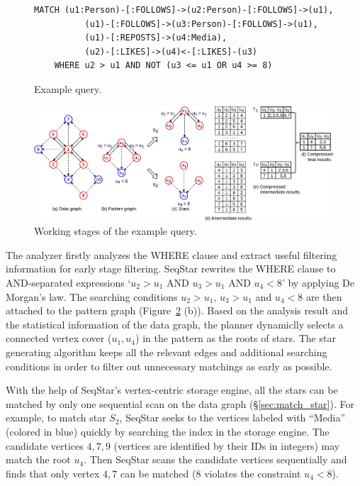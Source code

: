 \begin{figure}[ht]
  \begin{Verbatim}[fontsize=\small]
    MATCH (u1:Person)-[:FOLLOWS]->(u2:Person)-[:FOLLOWS]->(u1),
          (u1)-[:FOLLOWS]->(u3:Person)-[:FOLLOWS]->(u1),
          (u1)-[:REPOSTS]->(u4:Media),
          (u2)-[:LIKES]->(u4)<-[:LIKES]-(u3)
    WHERE u2 > u1 AND NOT (u3 <= u1 OR u4 >= 8)
  \end{Verbatim}
  \caption{Example query.}\label{img:cypher_query}
\end{figure}

\begin{figure}[ht]
  \centering
  \includegraphics[width=\textwidth]{img/running_example.pdf}
  \caption{Working stages of the example query.}\label{img:running_example}
\end{figure}

The analyzer firstly analyzes the WHERE clause and extract useful filtering information for early stage filtering.
SeqStar rewrites the WHERE clause to AND-separated expressions `$u_2 > u_1$ AND $u_3 > u_1$ AND $u_4 < 8$' by applying De Morgan's law.
The searching conditions $u_2> u_1$, $u_3 > u_1$ and $u_4 < 8$ are then attached to the pattern graph (Figure~\ref{img:running_example} (b)).
Based on the analysis result and the statistical information of the data graph,
the planner dynamiclly selects a connected vertex cover ($u_1, u_4$) in the pattern as the roots of stars.
The star generating algorithm keeps all the relevant edges and additional searching conditions in order to filter out unnecessary matchings as early as possible.

With the help of SeqStar's vertex-centric storage engine,
all the stars can be matched by only one sequential scan on the data graph (\S\ref{sec:match_star}).
For example, to match star $S_2$,
SeqStar seeks to the vertices labeled with ``Media'' (colored in blue) quickly by searching the index in the storage engine.
The candidate vertices $4, 7, 9$ (vertices are identified by their IDs in integers) may match the root $u_4$.
Then SeqStar scans the candidate vertices sequentially and finds that only vertex $4, 7$ can be matched ($8$ violates the constraint $u_4 < 8$).

